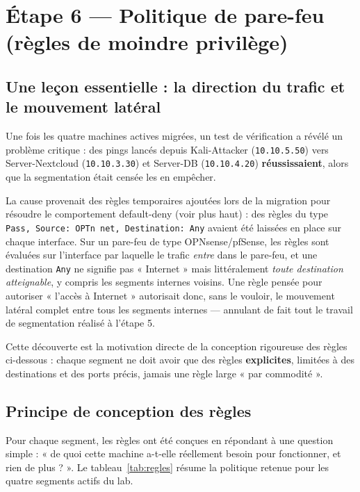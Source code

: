 \section{Étape 6 — Politique de pare-feu (règles de moindre privilège)}

\subsection{Une leçon essentielle : la direction du trafic et le mouvement latéral}
\label{sec:lecon-lateral}

Une fois les quatre machines actives migrées, un test de vérification a
révélé un problème critique : des pings lancés depuis Kali-Attacker
(\texttt{10.10.5.50}) vers Server-Nextcloud (\texttt{10.10.3.30}) et
Server-DB (\texttt{10.10.4.20}) \textbf{réussissaient}, alors que la
segmentation était censée les en empêcher.

La cause provenait des règles temporaires ajoutées lors de la migration
pour résoudre le comportement default-deny (voir plus haut) : des règles
du type \texttt{Pass, Source: OPTn net, Destination: Any} avaient été
laissées en place sur chaque interface. Sur un pare-feu de type
OPNsense/pfSense, les règles sont évaluées sur l'interface par laquelle le
trafic \emph{entre} dans le pare-feu, et une destination \texttt{Any} ne
signifie pas « Internet » mais littéralement \emph{toute destination
atteignable}, y compris les segments internes voisins. Une règle pensée
pour autoriser « l'accès à Internet » autorisait donc, sans le vouloir,
le mouvement latéral complet entre tous les segments internes — annulant
de fait tout le travail de segmentation réalisé à l'étape 5.

Cette découverte est la motivation directe de la conception rigoureuse des
règles ci-dessous : chaque segment ne doit avoir que des règles
\textbf{explicites}, limitées à des destinations et des ports précis,
jamais une règle large « par commodité ».

\subsection{Principe de conception des règles}

Pour chaque segment, les règles ont été conçues en répondant à une
question simple : « de quoi cette machine a-t-elle réellement besoin pour
fonctionner, et rien de plus ? ». Le tableau~\ref{tab:regles} résume la
politique retenue pour les quatre segments actifs du lab.

